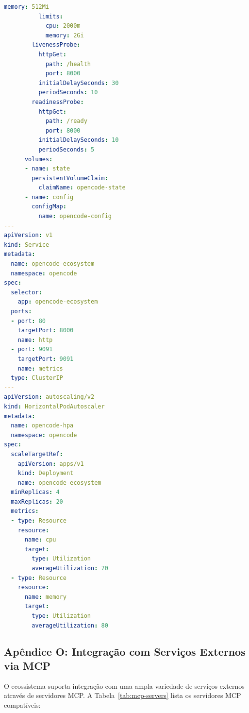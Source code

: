 \begin{lstlisting}[language=yaml,caption={Kubernetes Deployment para o OpenCode Ecosystem Core},label={lst:k8s-deployment}]
            memory: 512Mi
          limits:
            cpu: 2000m
            memory: 2Gi
        livenessProbe:
          httpGet:
            path: /health
            port: 8000
          initialDelaySeconds: 30
          periodSeconds: 10
        readinessProbe:
          httpGet:
            path: /ready
            port: 8000
          initialDelaySeconds: 10
          periodSeconds: 5
      volumes:
      - name: state
        persistentVolumeClaim:
          claimName: opencode-state
      - name: config
        configMap:
          name: opencode-config
---
apiVersion: v1
kind: Service
metadata:
  name: opencode-ecosystem
  namespace: opencode
spec:
  selector:
    app: opencode-ecosystem
  ports:
  - port: 80
    targetPort: 8000
    name: http
  - port: 9091
    targetPort: 9091
    name: metrics
  type: ClusterIP
---
apiVersion: autoscaling/v2
kind: HorizontalPodAutoscaler
metadata:
  name: opencode-hpa
  namespace: opencode
spec:
  scaleTargetRef:
    apiVersion: apps/v1
    kind: Deployment
    name: opencode-ecosystem
  minReplicas: 4
  maxReplicas: 20
  metrics:
  - type: Resource
    resource:
      name: cpu
      target:
        type: Utilization
        averageUtilization: 70
  - type: Resource
    resource:
      name: memory
      target:
        type: Utilization
        averageUtilization: 80
\end{lstlisting}

\subsection{Apêndice O: Integração com Serviços Externos via MCP}
\label{sec:apendice-mcp-servers}

O ecossistema suporta integração com uma ampla variedade de serviços externos através de servidores MCP. A Tabela~\ref{tab:mcp-servers} lista os servidores MCP compatíveis:


